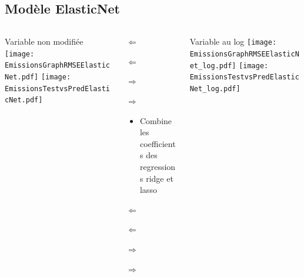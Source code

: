 \documentclass[8pt,aspectratio=169,hyperref={unicode=true}]{beamer}
\begin{document}
\subsection{Modèle ElasticNet}
\begin{frame}{\insertsubsection}
  \begin{columns}[t]
    \begin{column}{.33\textwidth}
      \centering Variable non modifiée
      \texttt{[image: EmissionsGraphRMSEElasticNet.pdf]}
      \texttt{[image: EmissionsTestvsPredElasticNet.pdf]}
    \end{column}
    \begin{column}{.33\textwidth}
      $\Longleftarrow$

      {\footnotesize
      }

      \raggedright
      $\Longleftarrow$

      \raggedleft
      $\Longrightarrow$

      {\footnotesize
      }

      \raggedleft
      $\Longrightarrow$

      \raggedright
      \begin{itemize}
        \item Combine les coefficients des regressions ridge et lasso
      \end{itemize}

      $\Longleftarrow$
      {\scriptsize \centering
          }

      $\Longleftarrow$

      \raggedleft
      $\Longrightarrow$

      {\scriptsize \centering
          
        }
      \raggedleft
      $\Longrightarrow$
    \end{column}
    \begin{column}{.33\textwidth}
      \centering Variable au log
      \texttt{[image: EmissionsGraphRMSEElasticNet\_log.pdf]}
      \texttt{[image: EmissionsTestvsPredElasticNet\_log.pdf]}
    \end{column}
  \end{columns}
\end{frame}
\end{document}
